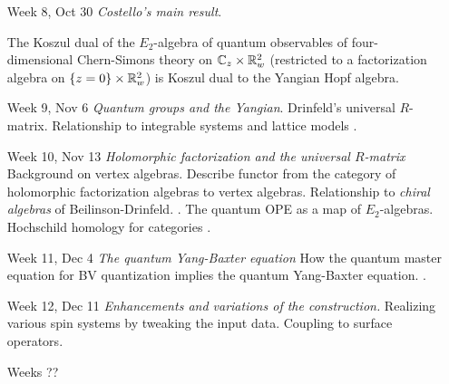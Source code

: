 \documentclass[10pt]{article}
\def\brian{\textcolor{blue}{BW: }\textcolor{blue}}
\begin{document}
\begin{itemize}
\item[Week 8, Oct 30] {\em Costello's main result}.
\begin{thm}
The Koszul dual of the $E_2$-algebra of quantum observables of four-dimensional Chern-Simons theory on $\mathbb C_z \times \mathbb R^2_w$ (restricted to a factorization algebra on $\{z=0\} \times \mathbb R^2_w$) is Koszul dual to the Yangian Hopf algebra. 
\end{thm}
\cite{CosBook, CG2, CosYangian,CWY1,CWY2}

\item[Week 9, Nov 6] {\em Quantum groups and the Yangian}.
Drinfeld's universal $R$-matrix. 
Relationship to integrable systems and lattice models \cite{Etingof, ChariPressley}.


\item[Week 10, Nov 13] {\em Holomorphic factorization and the universal $R$-matrix}
Background on vertex algebras.
Describe functor from the category of holomorphic factorization algebras to vertex algebras.
Relationship to {\em chiral algebras} of Beilinson-Drinfeld. 
\cite{CG1, BD}. 
The quantum OPE as a map of $E_2$-algebras.
Hochschild homology for categories \cite{CosYangian}.

\item[Week 11, Dec 4] {\em The quantum Yang-Baxter equation}
How the quantum master equation for BV quantization implies the quantum Yang-Baxter equation.
\cite{CWY1,CWY2}.

\item[Week 12, Dec 11] {\em Enhancements and variations of the construction.}
Realizing various spin systems by tweaking the input data. 
Coupling to surface operators. 

\item[Weeks ??] 

\end{itemize} 
\end{document}
